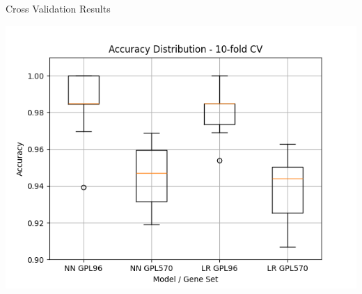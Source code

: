 \documentclass{beamer}
\begin{document}
    \begin{frame}{Cross Validation Results}
        \begin{center}
            \includegraphics[scale=.63]{accdist.png}
            \vspace{15pt}
        \end{center}
    \end{frame}
\end{document}
